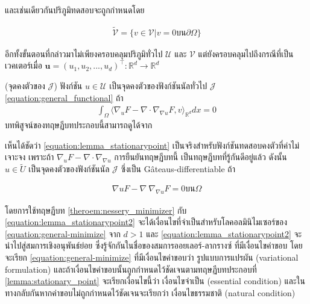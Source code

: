 และเช่นเดียวกันปริภูมิทดสอบจะถูกกำหนดโดย

\begin{align}
    \tilde{\mathcal{V}} = \{v \in \mathcal{V} | v = 0 \text{บน} \partial \Omega \}
\end{align}

อีกทั้งขั้นตอนที่กล่าวมาไม่เพียงครอบคลุมปริภูมิทั่วไป $\mathcal{U}$ และ $\mathcal{V}$ แต่ยังครอบคลุมไปถึงกรณีที่เป็นเวคเตอร์เมื่อ $ \boldsymbol{u} = (u_1,u_2,...,u_d)^\top : \mathbb{R}^{d} \rightarrow \mathbb{R}^{d}$

\begin{Lemma}
    (จุดคงตัวของ $\mathcal{J}$) ฟังก์ชัน $u \in \mathcal{U}$ เป็นจุดคงตัวของฟังก์ชันนัลทั่วไป $\mathcal{J}$ \ref{equation:general_functional} ถ้า
    \begin{align}
        \int_{\Omega} \Big \langle \nabla_u F - \nabla \cdot \nabla_{\nabla u} F,v \Big \rangle_{\mathbb{R}^{d}} dx = 0
        \label{equation:lemma_stationarypoint}
    \end{align}
    \label{lemma:stationary_point}
    บทพิสูจน์ของทฤษฏีบทประกอบนี้สามารถดูได้จาก \cite{general_functional_stationary}
\end{Lemma}

เห็นได้ชัดว่า \ref{equation:lemma_stationarypoint} เป็นจริงสำหรับฟังก์ชันทดสอบคงตัวที่ค่าไม่เจาะจง เพราะถ้า $\nabla_u F - \nabla \cdot \nabla_{\nabla u}$ การยืนยันทฤษฏีบทนี้ เป็นทฤษฏีบทที่รู้กันดีอยู่แล้ว ดังนั้น $u \in \tilde{U}$ เป็นจุดคงตัวของฟังก์ชันนัล $\mathcal{J}$ ซึ่งเป็น G\^{a}teaus-differentiable ถ้า 

\begin{align}
    \nabla u F - \nabla \ \nabla_{\nabla u} F = 0 \text{บน} \Omega
    \label{equation:lemma_stationarypoint2}
\end{align}

โดยการใช้ทฤษฏีบท \ref{theroem:nessery_minimizer} กับ  \ref{equation:lemma_stationarypoint2} จะได้เงื่อนไขที่จำเป็นสำหรับโลคอลมินิไมเซอร์ของ \ref{equation:general-minimize} จาก $ d > 1$ และ \ref{equation:lemma_stationarypoint2} จะนำไปสู่สมการเชิงอนุพันธ์ย่อย ซึ่งรู้จักกันในชื่อของสมการออยเลอร์-ลากรางซ์ ที่มีเงื่อนไขค่าขอบ โดยจะเรียก \ref{equation:general-minimize} ที่มีเงื่อนไขค่าขอบว่า รูปแบบการแปรผัน (variational formulation) และถ้าเงื่อนไขค่าขอบนั้นถูกกำหนดไว้ชัดเจนตามทฤษฏีบทประกอบที่ \ref{lemma:stationary_point} จะเรียกเงื่อนไขนี้ว่า เงื่อนไขจำเป็น (essential condition) และในทางกลับกันหากค่าขอบไม่ถูกกำหนดไว้ชัดเจนจะเรียกว่า เงื่อนไขธรรมชาติ (natural condition)